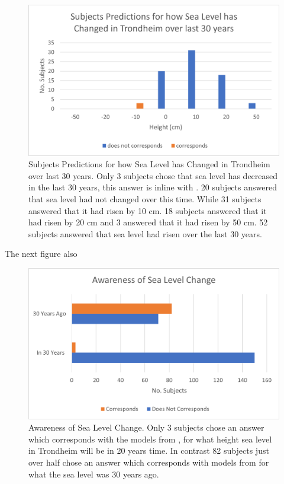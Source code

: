 \begin{figure}[h]
    \centering
    \includegraphics{fig_results/slr-past.png}
    \caption{Subjects Predictions for how Sea Level has Changed in Trondheim over last 30 years. Only 3 subjects chose that sea level has decreased in the last 30 years, this answer is inline with \cite{kartverket_se_2021}. 20 subjects answered that sea level had not changed over this time. While 31 subjects answered that it had risen by 10 cm. 18 subjects answered that it had risen by 20 cm and 3 answered that it had risen by 50 cm. 52 subjects answered that sea level had risen over the last 30 years. }
    \label{fig:my_label}
\end{figure}

The next figure also 
\begin{figure}[h]
    \centering
    \includegraphics{fig_results/Aware_sea_level_change.png}
    \caption{Awareness of Sea Level Change. Only 3 subjects chose an answer which corresponds with the models from \cite{kartverket_se_2021}, for what height sea level in Trondheim will be in 20 years time. In contrast 82 subjects just over half chose an answer which corresponds with models from \cite{kartverket_se_2021} for what the sea level was 30 years ago. }
    \label{fig:my_label}
\end{figure}
